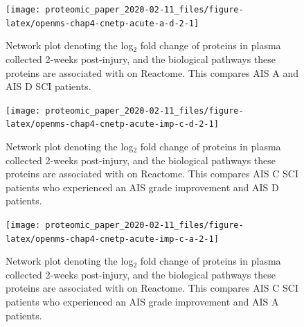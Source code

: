 \documentclass[9pt,lineno]{elife}
\newcommand{\blandscape}{\begin{landscape}}
\newcommand{\elandscape}{\end{landscape}}
\begin{document}
\begin{landscape}
\begin{landscape}
\begin{landscape}
\begin{landscape}
\begin{landscape}
\elandscape
\blandscape



\begin{figure}

{\centering \texttt{[image: proteomic\_paper\_2020-02-11\_files/figure-latex/openms-chap4-cnetp-acute-a-d-2-1]} 

}

\caption[Network plot - label-free - Acute A VS Acute D]{Network plot denoting the log\(_2\) fold change of proteins in plasma collected 2-weeks post-injury, and the biological pathways these proteins are associated with on Reactome. This compares AIS A and AIS D SCI patients.}\label{fig:openms-chap4-cnetp-acute-a-d-2}
\end{figure}

\elandscape
\blandscape



\begin{figure}

{\centering \texttt{[image: proteomic\_paper\_2020-02-11\_files/figure-latex/openms-chap4-cnetp-acute-imp-c-d-2-1]} 

}

\caption[Network plot - label-free - Acute C Improvers VS Acute D]{Network plot denoting the log\(_2\) fold change of proteins in plasma collected 2-weeks post-injury, and the biological pathways these proteins are associated with on Reactome. This compares AIS C SCI patients who experienced an AIS grade improvement and AIS D patients.}\label{fig:openms-chap4-cnetp-acute-imp-c-d-2}
\end{figure}

\elandscape
\blandscape



\begin{figure}

{\centering \texttt{[image: proteomic\_paper\_2020-02-11\_files/figure-latex/openms-chap4-cnetp-acute-imp-c-a-2-1]} 

}

\caption[Network plot - label-free - Acute A VS Acute C Improvers]{Network plot denoting the log\(_2\) fold change of proteins in plasma collected 2-weeks post-injury, and the biological pathways these proteins are associated with on Reactome. This compares AIS C SCI patients who experienced an AIS grade improvement and AIS A patients.}\label{fig:openms-chap4-cnetp-acute-imp-c-a-2}
\end{figure}

\elandscape
\blandscape




\end{landscape}
\end{landscape}
\end{landscape}
\end{landscape}
\end{landscape}
\end{document}
